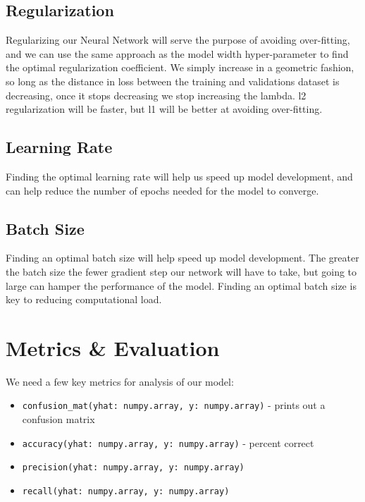 \documentclass{article}
\begin{document}
	\subsection{Regularization}
	
	Regularizing our Neural Network will serve the purpose of avoiding over-fitting, and we can use the same approach as the model width hyper-parameter to 
	find the optimal regularization coefficient. We simply increase in a geometric fashion, so long as the distance in loss between the training and 
	validations dataset is decreasing, once it stops decreasing we stop increasing the lambda. l2 regularization will be faster, but l1 will be better 
	at avoiding over-fitting.  
	
	\subsection{Learning Rate}
	
	Finding the optimal learning rate will help us speed up model development, and can help reduce the number of epochs needed for the model to converge. 
	
	\subsection{Batch Size}
	
	Finding an optimal batch size will help speed up model development. The greater the batch size the fewer gradient step our network will have to take, 
	but going to large can hamper the performance of the model. Finding an optimal batch size is key to reducing computational load. 
	
	\section{Metrics \& Evaluation}
	
	We need a few key metrics for analysis of our model: 
	
	\begin{itemize}
		\item \verb|confusion_mat(yhat: numpy.array, y: numpy.array)| - prints out a confusion matrix 
		\item \verb|accuracy(yhat: numpy.array, y: numpy.array)| - percent correct 
		\item \verb|precision(yhat: numpy.array, y: numpy.array)| 
		\item \verb|recall(yhat: numpy.array, y: numpy.array)| 
	\end{itemize}
	
	

	
\end{document}
